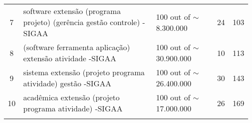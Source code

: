 \begin{table}[!htb]
\begin{tabular}{c|p{6cm}|l|p{1.5cm}|c}
    \rowcolor[rgb]{0.898,0.898,0.898} 7            & software extensão (programa \textbar{} projeto) (gerência \textbar{} gestão \textbar{} controle) -SIGAA                     & 100 out of $\sim$8.300.000  & 24                                                               & 103            \\
    8                                              & (software \textbar{} ferramenta \textbar{} aplicação) extensão atividade -SIGAA                                             & 100 out of $\sim$30.900.000 & 10                                                               & 113            \\
    \rowcolor[rgb]{0.898,0.898,0.898} 9            & sistema extensão (projeto \textbar{} programa \textbar{} atividade) gestão -SIGAA                                           & 100 out of $\sim$26.400.000 & 30                                                               & 143            \\
    10                                             & acadêmica extensão (projeto \textbar{} programa \textbar{} atividade) -SIGAA                                                & 100 out of $\sim$17.000.000 & 26                                                               & 169            \\
    \arrayrulecolor{black}\toprule
  \end{tabular}
\end{table}